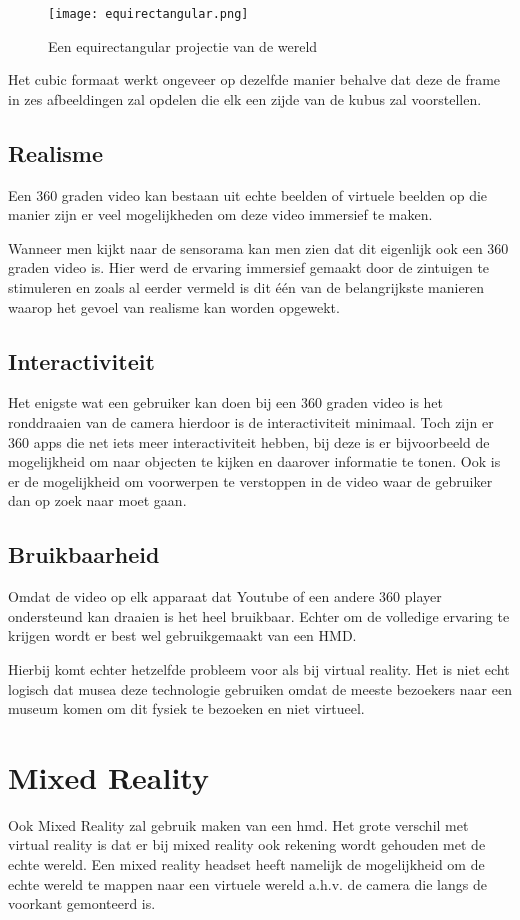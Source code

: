 \begin{figure}
    \texttt{[image: equirectangular.png]}
    \caption{Een equirectangular projectie van de wereld}
    \label{fig:equirectangularprojection}
\end{figure}

Het cubic formaat werkt ongeveer op dezelfde manier behalve dat deze de frame in zes afbeeldingen zal opdelen die elk een zijde van de kubus zal voorstellen.

\subsection{Realisme}
Een 360 graden video kan bestaan uit echte beelden of virtuele beelden op die manier zijn er veel mogelijkheden om deze video immersief te maken. 

Wanneer men kijkt naar de sensorama kan men zien dat dit eigenlijk ook een 360 graden video is. Hier werd de ervaring immersief gemaakt door de zintuigen te stimuleren en zoals al eerder vermeld is dit één van de belangrijkste manieren waarop het gevoel van realisme kan worden opgewekt.

\subsection{Interactiviteit}
Het enigste wat een gebruiker kan doen bij een 360 graden video is het ronddraaien van de camera hierdoor is de interactiviteit minimaal. Toch zijn er 360 apps die net iets meer interactiviteit hebben, bij deze is er bijvoorbeeld de mogelijkheid om naar objecten te kijken en daarover informatie te tonen. Ook is er de mogelijkheid om voorwerpen te verstoppen in de video waar de gebruiker dan op zoek naar moet gaan.
\subsection{Bruikbaarheid}
Omdat de video op elk apparaat dat Youtube of een andere 360 player ondersteund kan draaien is het heel bruikbaar. Echter om de volledige ervaring te krijgen wordt er best wel gebruikgemaakt van een HMD.

Hierbij komt echter hetzelfde probleem voor als bij virtual reality. Het is niet echt logisch dat musea deze technologie gebruiken omdat de meeste bezoekers naar een museum komen om dit fysiek te bezoeken en niet virtueel.

\section{Mixed Reality} \label{sec:mixedreality}
Ook Mixed Reality zal gebruik maken van een \acrshort{hmd}. Het grote verschil met virtual reality is dat er bij mixed reality ook rekening wordt gehouden met de echte wereld. Een mixed reality headset heeft namelijk de mogelijkheid om de echte wereld te mappen naar een virtuele wereld a.h.v. de camera die langs de voorkant gemonteerd is.

